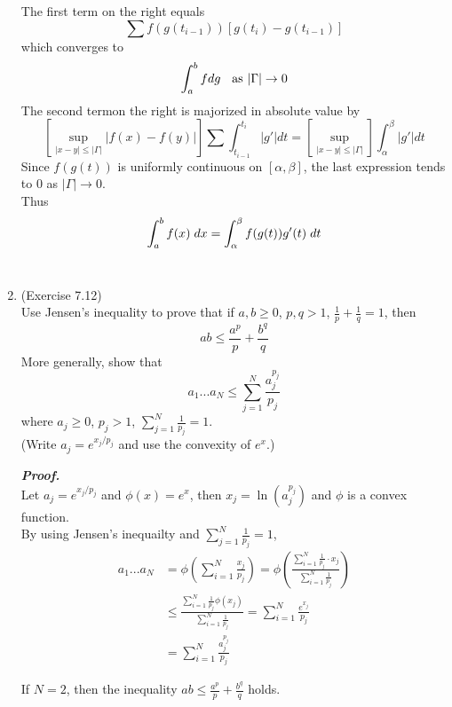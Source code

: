 \documentclass[a4paper,11pt]{article}
\begin{document}
\begin{enumerate}
		The first term on the right equals
		$$\sum f(g(t_{i-1})) [g(t_i) - g(t_{i-1})]$$
		which converges to
		$$\int_a^b f dg \hspace{0.2cm} \mbox{ as $|\Gamma| \to 0$}$$
		The second termon the right is majorized in absolute value by
		$$\left[ \underset{|x- y| \leq |\Gamma|}{\sup} |f(x) - f(y)| \right] \sum \int_{t_{i-1}}^{t_i} |g'| dt
		= \left[ \underset{|x-y| \leq |\Gamma|}{\sup} \right] \int_\alpha^\beta |g'| dt$$
		Since $f(g(t))$ is uniformly continuous on $[\alpha, \beta]$, the last expression tends to $0$ as $|\Gamma| \to 0$.\\
		Thus
		$$\int_a^b f(x) \hspace{0.1cm} dx = \int_\alpha^\beta f(g(t)) g'(t) \hspace{0.1cm} dt$$\\






 	\item (Exercise 7.12)\\
 		Use Jensen's inequality to prove that if $a, b \geq 0$, $p, q > 1$, $\frac{1}{p} + \frac{1}{q} = 1$, then
 		$$ab \leq \frac{a^p}{p} + \frac{b^q}{q}$$
 		More generally, show that
 		$$a_1 ... a_N \leq \sum_{j=1}^N \frac{a_j^{p_j}}{p_j}$$
 		where $a_j \geq 0$, $p_j > 1$, $\sum_{j=1}^N \frac{1}{p_j} = 1$.\\
 		(Write $a_j = e^{x_j / p_j}$ and use the convexity of $e^x$.)

 		\textit{\textbf {Proof.}}\\
 		Let $a_j = e^{x_j / p_j}$ and $\phi(x) = e^x$, then $x_j = \ln (a_j^{p_j})$ and $\phi$ is a convex function.\\
 		By using Jensen's inequailty and $\sum_{j=1}^N \frac{1}{p_j} = 1$,
 		$$\begin{aligned}
 		a_1...a_N
 		&= \phi\left(\sum_{i=1}^N \frac{x_j}{p_j}\right)
 		= \phi\left(\frac{\sum_{i=1}^N \frac{1}{p_j} \cdot x_j}{\sum_{i=1}^N \frac{1}{p_j}}\right)\\
 		&\leq \frac{\sum_{i=1}^N \frac{1}{p_j} \phi(x_j)}{\sum_{i=1}^N \frac{1}{p_j}}
 		= \sum_{i=1}^N \frac{e^{x_j}}{p_j}\\
 		&= \sum_{i=1}^N \frac{a_j^{p_j}}{p_j}
 		\end{aligned}$$

 		If $N = 2$, then the inequality $ab \leq \frac{a^p}{p} + \frac{b^q}{q}$ holds.\\







\end{enumerate}
\end{document}
